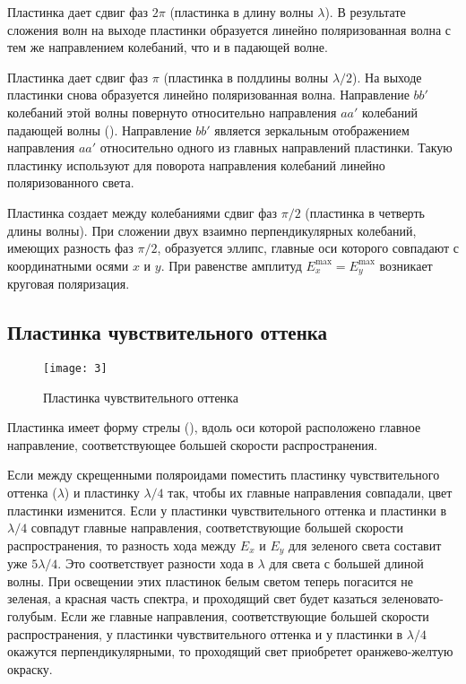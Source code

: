 \documentclass[a4paper, 12pt]{article}
\begin{document}
Пластинка дает сдвиг фаз $2\pi$ (пластинка в длину волны $\lambda$). В
результате сложения волн на выходе пластинки образуется линейно
поляризованная волна с тем же направлением колебаний, что и в падающей
волне.

Пластинка дает сдвиг фаз $\pi$ (пластинка в полдлины волны
$\lambda/2$). На выходе пластинки снова образуется линейно
поляризованная волна. Направление $bb'$ колебаний этой волны повернуто
относительно направления $aa'$ колебаний падающей волны ().
Направление $bb'$ является зеркальным отображением направления $aa'$
относительно одного из главных направлений пластинки. Такую пластинку
используют для поворота направления колебаний линейно поляризованного
света.

Пластинка создает между колебаниями сдвиг фаз $\pi/2$ (пластинка в
четверть длины волны). При сложении двух взаимно перпендикулярных
колебаний, имеющих разность фаз $\pi/2$, образуется эллипс, главные
оси которого совпадают с координатными осями $x$ и $y$. При равенстве
амплитуд $E_x^\text{max} = E_y^\text{max}$ возникает круговая
поляризация.

\subsection*{Пластинка чувствительного оттенка}

\begin{wrapfigure}{l}{0.25\linewidth}
    \texttt{[image: 3]}
    \caption{Пластинка чувствительного оттенка}
    \label{fig:3}
\end{wrapfigure}

Пластинка имеет форму стрелы (), вдоль оси которой
расположено главное направление, соответствующее большей скорости
распространения.

Если между скрещенными поляроидами поместить пластинку чувствительного
оттенка ($\lambda$) и пластинку $\lambda/4$ так, чтобы их главные
направления совпадали, цвет пластинки изменится. Если у пластинки
чувствительного оттенка и пластинки в $\lambda/4$ совпадут главные
направления, соответствующие большей скорости распространения, то
разность хода между $E_x$ и $E_y$ для зеленого света составит уже
$5\lambda/4$. Это соответствует разности хода в $\lambda$ для света с
большей длиной волны. При освещении этих пластинок белым светом теперь
погасится не зеленая, а красная часть спектра, и проходящий свет будет
казаться зеленовато-голубым. Если же главные направления,
соответствующие большей скорости распространения, у пластинки
чувствительного оттенка и у пластинки в $\lambda/4$ окажутся
перпендикулярными, то проходящий свет приобретет оранжево-желтую
окраску.
\end{document}

